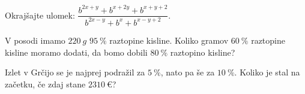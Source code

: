 \documentclass[addpoints]{exam}
\begin{document}
\begin{questions}
\begin{parts}
    
        \end{parts}




        \question[4]
    Okrajšajte ulomek: $\dfrac{b^{2x+y}+b^{x+2y}+b^{x+y+2}}{b^{2x-y}+b^x+b^{x-y+2}}$.





    \question[4]
    V posodi imamo $220~g$ $95~\%$ raztopine kisline. Koliko gramov $60~\%$ raztopine kisline moramo dodati, da bomo dobili $80~\%$ raztopino kisline?
    
    




    \question[4]
    Izlet v Grčijo se je najprej podražil za $5~\%$, nato pa še za $10~\%$. 
    Koliko je stal na začetku, če zdaj stane $2310~€$?
    
    


\end{questions}
\end{document}
